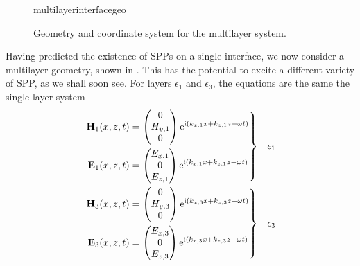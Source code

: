 \begin{figure}[ht]
 \centering
 {multilayerinterfacegeo}
 \caption{Geometry and coordinate system for the multilayer system. }
 \label{fig:multilayergeo}
\end{figure}
Having predicted the existence of SPPs on a single interface, we now
consider a multilayer geometry, shown in .  This
has the potential to excite a different variety of SPP, as we shall soon
see.  For
layers $\epsilon_1$ and $\epsilon_3$, the equations are the same the
single layer system
\begin{align}
\left.\begin{aligned}
\mathbf{H}_1(x,z,t) &=
\begin{pmatrix}
0\\
H_{y,1}\\
0
\end{pmatrix} {\mathrm{e}}^{{\mathrm{i}}(k_{x,1}x+k_{z,1}z-\omega t)}\\
\mathbf{E}_1(x,z,t) &=
\begin{pmatrix}
E_{x,1}\\
0\\
E_{z,1}\\
\end{pmatrix} {\mathrm{e}}^{{\mathrm{i}}(k_{x,1}x+k_{z,1}z-\omega t)}
\end{aligned}
\right\}& \quad \epsilon_1\label{eqn:lrsppplanewavedielectric}\\
\left.\begin{aligned}
\mathbf{H}_3(x,z,t) &=
\begin{pmatrix}
0\\
H_{y,3}\\
0
\end{pmatrix}
{\mathrm{e}}^{{\mathrm{i}}(k_{x,3}x+k_{z,3}z-\omega t)}\\
\mathbf{E}_3(x,z,t) &=
\begin{pmatrix}
E_{x,3}\\
0\\
E_{z,3}\\
\end{pmatrix}
{\mathrm{e}}^{{\mathrm{i}}(k_{x,3}x+k_{z,3}z-\omega t)}
\end{aligned} 
\right\}&\quad \epsilon_3
\label{eqn:lrsppplanewavemetal}
\end{align}

